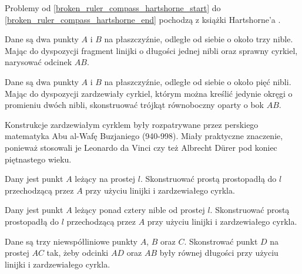 %

Problemy od \ref{broken_ruler_compass_hartshorne_start} do \ref{broken_ruler_compass_hartshorne_end} pochodzą z książki Hartshorne'a \cite[s. 25, 26]{hartshorne2000}.

\begin{problem}
    \label{broken_ruler_compass_hartshorne_start}
    Dane są dwa punkty $A$ i $B$ na płaszczyźnie, odległe od siebie o około trzy nible.
    Mając do dyspozycji fragment linijki o długości jednej nibli oraz sprawny cyrkiel, narysować odcinek $AB$.
\end{problem}

\begin{problem}
    Dane są dwa punkty $A$ i $B$ na płaszczyźnie, odległe od siebie o około pięć nibli.
    Mając do dyspozycji zardzewiały cyrkiel, którym można kreślić jedynie okręgi o promieniu dwóch nibli, skonstruować trójkąt równoboczny oparty o bok $AB$.
\end{problem}

Konstrukcje zardzewiałym cyrklem były rozpatrywane przez perskiego matematyka Abu al-Wafę Buzjaniego (940-998).
%
Miały praktyczne znaczenie, ponieważ stosowali je Leonardo da Vinci czy też Albrecht Dürer pod koniec piętnastego wieku.
%
%

\begin{problem}
    Dany jest punkt $A$ leżący na prostej $l$.
    Skonstruować prostą prostopadłą do $l$ przechodzącą przez $A$ przy użyciu linijki i zardzewiałego cyrkla.
\end{problem}

\begin{problem}
    Dany jest punkt $A$ leżący ponad cztery nible od prostej $l$.
    Skonstruować prostą prostopadłą do $l$ przechodzącą przez $A$ przy użyciu linijki i zardzewiałego cyrkla.
\end{problem}

\begin{problem}
    Dane są trzy niewspółliniowe punkty $A$, $B$ oraz $C$.
    Skonstrować punkt $D$ na prostej $AC$ tak, żeby odcinki $AD$ oraz $AB$ były równej długości przy użyciu linijki i zardzewiałego cyrkla.
\end{problem}

